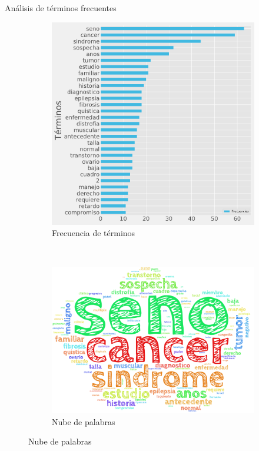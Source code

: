 \documentclass[xcolor=dvipsnames]{beamer}
\begin{document}
\begin{frame}{Análisis de términos frecuentes}
	
   \begin{figure}
		\centering
		\begin{subfigure}[b]{0.4\textwidth}
			\includegraphics[width=\textwidth]{frecuecias.pdf}
			\caption{Frecuencia de términos}
		\end{subfigure}
		~ %
		\begin{subfigure}[b]{0.47\textwidth}
			\includegraphics[width=\textwidth]{sin_stop.png}
			\caption{Nube de palabras}
		\end{subfigure}
	\end{figure}
\end{frame}
\end{document}
